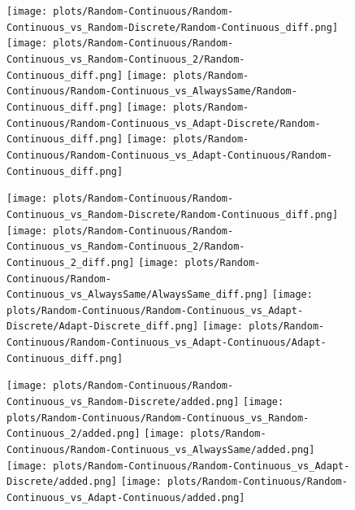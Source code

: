 \documentclass{article}
\begin{document}
\begin{figure}[!h]
	\centering
	\begin{minipage}[c]{0.1\textwidth}
		\raggedleft
	\end{minipage}
	\begin{minipage}[c]{0.80\textwidth}
		\texttt{[image: plots/Random-Continuous/Random-Continuous\_vs\_Random-Discrete/Random-Continuous\_diff.png]}\hfill
		\texttt{[image: plots/Random-Continuous/Random-Continuous\_vs\_Random-Continuous\_2/Random-Continuous\_diff.png]}\hfill
		\texttt{[image: plots/Random-Continuous/Random-Continuous\_vs\_AlwaysSame/Random-Continuous\_diff.png]}\hfill
		\texttt{[image: plots/Random-Continuous/Random-Continuous\_vs\_Adapt-Discrete/Random-Continuous\_diff.png]}\hfill
		\texttt{[image: plots/Random-Continuous/Random-Continuous\_vs\_Adapt-Continuous/Random-Continuous\_diff.png]}\hfill
\end{minipage}
\end{figure}
\begin{figure}[!h]
	\centering
	\begin{minipage}[c]{0.1\textwidth}
		\raggedleft
	\end{minipage}
	\begin{minipage}[c]{0.80\textwidth}
		\texttt{[image: plots/Random-Continuous/Random-Continuous\_vs\_Random-Discrete/Random-Continuous\_diff.png]}\hfill
		\texttt{[image: plots/Random-Continuous/Random-Continuous\_vs\_Random-Continuous\_2/Random-Continuous\_2\_diff.png]}\hfill
		\texttt{[image: plots/Random-Continuous/Random-Continuous\_vs\_AlwaysSame/AlwaysSame\_diff.png]}\hfill
		\texttt{[image: plots/Random-Continuous/Random-Continuous\_vs\_Adapt-Discrete/Adapt-Discrete\_diff.png]}\hfill
		\texttt{[image: plots/Random-Continuous/Random-Continuous\_vs\_Adapt-Continuous/Adapt-Continuous\_diff.png]}\hfill
\end{minipage}
\end{figure}
\begin{figure}[!h]
	\centering
	\begin{minipage}[c]{0.1\textwidth}
		\raggedleft
	\end{minipage}
	\begin{minipage}[c]{0.80\textwidth}
		\texttt{[image: plots/Random-Continuous/Random-Continuous\_vs\_Random-Discrete/added.png]}\hfill
		\texttt{[image: plots/Random-Continuous/Random-Continuous\_vs\_Random-Continuous\_2/added.png]}\hfill
		\texttt{[image: plots/Random-Continuous/Random-Continuous\_vs\_AlwaysSame/added.png]}\hfill
		\texttt{[image: plots/Random-Continuous/Random-Continuous\_vs\_Adapt-Discrete/added.png]}\hfill 
		\texttt{[image: plots/Random-Continuous/Random-Continuous\_vs\_Adapt-Continuous/added.png]}\hfill
	\end{minipage}
\end{figure}
\end{document}
